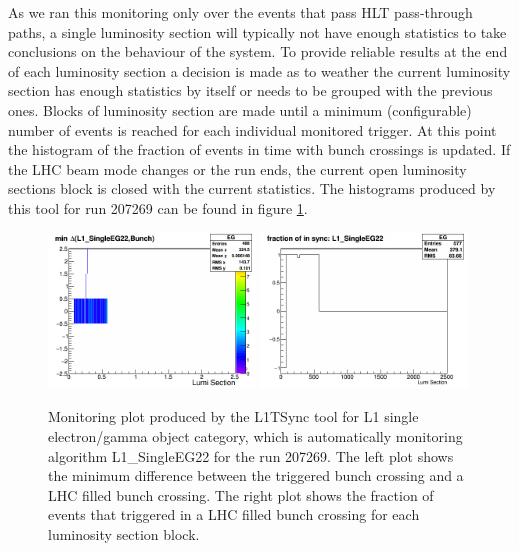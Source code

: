 As we ran this monitoring only over the events that pass \gls{HLT} pass-through paths, a single luminosity section will typically not have enough statistics to take conclusions on the behaviour of the system. To provide reliable results at the end of each luminosity section a decision is made as to weather the current luminosity section has enough statistics by itself or needs to be grouped with the previous ones. Blocks of luminosity section are made until a minimum (configurable) number of events is reached for each individual monitored trigger. At this point the histogram of the fraction of events in time with bunch crossings is updated. If the \gls{LHC} beam mode changes or the run ends, the current open luminosity sections block is closed with the current statistics. The histograms produced by this tool for run 207269 can be found in figure \ref{FIGURE:TechnicalWork_SyncMonitoring}.

\begin{figure}[!htb]
\centering
\includegraphics[width=0.49\textwidth]{Chapter03/L1TOnline/Images/L1TDQM_Online_Run207269_L1TSync_AlgoVsBunchStructure_EG.png}
\includegraphics[width=0.49\textwidth]{Chapter03/L1TOnline/Images/L1TDQM_Online_Run207269_L1TSync_Certification_EG.png}
\caption{Monitoring plot produced by the L1TSync tool for L1 single electron/gamma object category, which is
automatically monitoring algorithm L1\_SingleEG22 for the run 207269. The left plot shows the minimum difference between the triggered bunch crossing and a \gls{LHC} filled bunch crossing. The right plot shows the fraction of events that triggered in a \gls{LHC} filled bunch crossing for each luminosity section block.}
\label{FIGURE:TechnicalWork_SyncMonitoring}
\end{figure}

